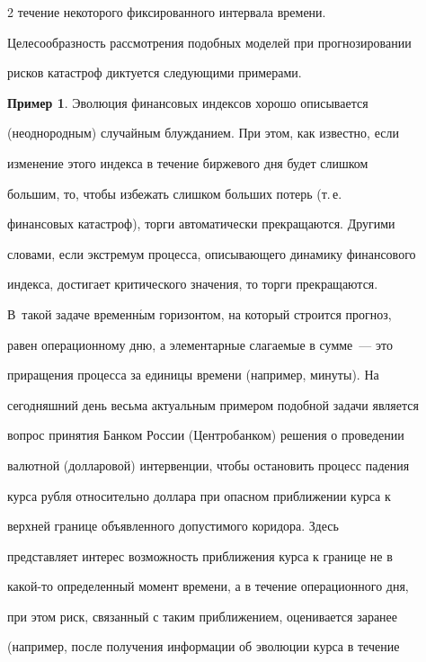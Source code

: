\begin{multicols}{2}
течение некоторого фиксированного интервала времени.


Целесообразность рассмотрения подобных моделей при прогнозировании


рисков катастроф диктуется следующими примерами.





\medskip





\noindent


\textbf{Пример 1}. Эволюция финансовых индексов хорошо описывается


(неоднородным) случайным блуж\-да\-ни\-ем. При этом, как известно, если


изменение этого индекса в течение биржевого дня будет слишком


большим, то, чтобы избежать слишком больших потерь (т.\,е.\


финансовых катастроф), торги автоматически прекращаются. Другими


словами, если экстремум процесса, описывающего динамику финансового


индекса, достигает критического значения, то торги прекращаются. 


В~такой задаче временн$\acute{\mbox{ы}}$м горизонтом, на который строится прогноз,


равен операционному дню, а элементарные слагаемые в сумме~--- это


приращения процесса за единицы времени (например, минуты). На


сегодняшний день весьма актуальным примером подобной задачи является


вопрос принятия Банком России (Центробанком) решения о проведении


валютной (долларовой) интервенции, чтобы остановить процесс падения


курса рубля относительно доллара при опасном приближении курса к


верхней границе объявленного допустимого коридора. Здесь


представляет интерес возможность приближения курса к границе не в


какой-то определенный момент времени, а в течение операционного дня,


при этом риск, связанный с таким приближением, оценивается заранее


(например, после получения информации об эволюции курса в течение



\end{multicols}
